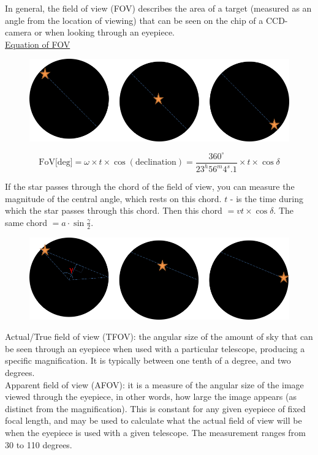 \documentclass[a4paper,12pt]{extarticle}
\begin{document}
In general, the field of view (FOV) describes the area of a target (measured as an angle from the location of viewing) that can be seen on the chip of a CCD-camera or when looking through an eyepiece.\\

\underline{\textsf{Equation of FOV}}\\

\begin{figure}[H]
	\centering
	\includegraphics[width=0.9\linewidth]{FOV1.png}
\end{figure}
\begin{defi}
	\[\text{FoV[deg]}= \omega \times t \times \cos(\text{declination})=\frac{360^\circ}{23^h56^m4^s.1}\times t\times \cos\delta\]
\end{defi}

If the star passes through the chord of the field of view, you can measure the magnitude of the central angle, which rests on this chord. $t$ - is the time during which the star passes through this chord. Then this chord $= vt \times \cos\delta $. The same chord $=a\cdot \sin\frac{\gamma}{2}$. 

\begin{figure}[H]
	\centering
	\includegraphics[width=0.9\linewidth]{FOV2.png}
\end{figure}

\textsf{Actual/True field of view (TFOV):} the angular size of the amount of sky that can	be seen through an eyepiece when used with a particular telescope, producing a specific magnification. It is typically between one tenth of a degree, and two degrees.\\ 

\textsf{Apparent field of view (AFOV):} it is a measure of the angular size of the image viewed through the eyepiece, in other words, how large the image appears (as distinct from the magnification). This is constant for any given eyepiece of fixed focal length, and may be used to calculate what the actual field of view will be when the eyepiece is used with a given telescope. The measurement ranges from 30 to 110 degrees.\\
\end{document}
